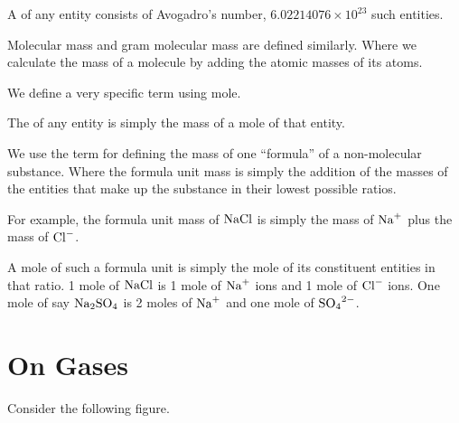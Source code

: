 \begin{definition}
    A  of any entity consists of Avogadro's number, \(6.02214076 \times 10^{23}\) such entities.
\end{definition}

Molecular mass and gram molecular mass are defined similarly. Where we calculate
the mass of a molecule by adding the atomic masses of its atoms.

We define a very specific term using mole.

\begin{definition}
    The  of any entity is simply the mass of a mole of that entity.
\end{definition}

We use the term  for defining the mass 
of one ``formula'' of a non-molecular substance. Where the formula unit 
mass is simply the addition of the masses of the entities that make up the
substance in their lowest possible ratios.

For example, the formula unit mass of \(\ce{NaCl}\) is simply 
the mass of \(\ce{Na+}\) plus the mass of \(\ce{Cl-}\). 

A mole of such a formula unit is simply the mole of its constituent entities in that ratio.
1 mole of \(\ce{NaCl}\) is 1 mole of \(\ce{Na+}\) ions and 1 mole of \(\ce{Cl-}\) ions. 
One mole of say \(\ce{Na2SO4}\) is 2 moles of \(\ce{Na+}\) and one mole of \(\ce{SO4^{2-}}\).


\section{On Gases}

Consider the following figure.

